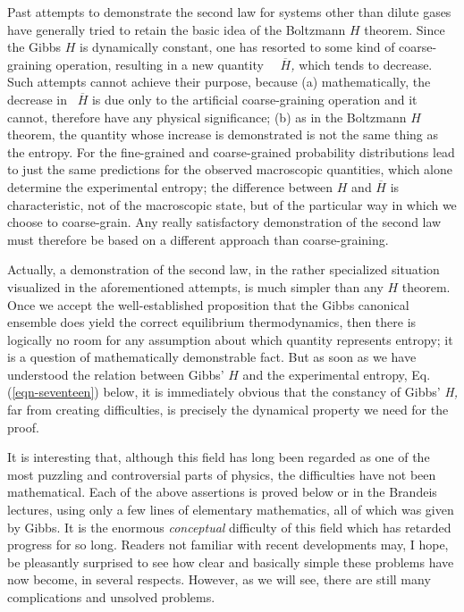 \documentclass[twocolumn]{article}
\begin{document}
Past attempts to demonstrate the second law for systems other than
dilute gases have generally tried to retain the basic idea of the
Boltzmann $H$ theorem. Since the Gibbs $H$ is dynamically
constant, one has resorted to some kind of coarse-graining operation,
resulting in a new quantity ~~\(\overline{H}\)\emph{,} which tends to
decrease. Such attempts cannot achieve their purpose, because (a)
mathematically, the decrease in ~\(\overline{H}\) is due only to the
artificial coarse-graining operation and it cannot, therefore have any
physical significance; (b) as in the Boltzmann $H$ theorem, the
quantity whose increase is demonstrated is not the same thing as the
entropy. For the fine-grained and coarse-grained probability
distributions lead to just the same predictions for the observed
macroscopic quantities, which alone determine the experimental entropy;
the difference between \(H\) and \(\overline{H}\) is characteristic, not
of the macroscopic state, but of the particular way in which we choose
to coarse-grain. Any really satisfactory demonstration of the second law
must therefore be based on a different approach than coarse-graining.

Actually, a demonstration of the second law, in the rather specialized
situation visualized in the aforementioned attempts, is much simpler
than any $H$ theorem. Once we accept the well-established
proposition that the Gibbs canonical ensemble does yield the correct
equilibrium thermodynamics, then there is logically no room for any
assumption about which quantity represents entropy; it is a question of
mathematically demonstrable fact. But as soon as we have understood the
relation between Gibbs' $H$ and the experimental entropy, Eq. (\ref{eqn-seventeen})
below, it is immediately obvious that the constancy of Gibbs' \emph{H,}
far from creating difficulties, is precisely the dynamical property we
need for the proof.

It is interesting that, although this field has long been regarded as
one of the most puzzling and controversial parts of physics, the
difficulties have not been mathematical. Each of the above assertions is
proved below or in the Brandeis lectures, using only a few lines of
elementary mathematics, all of which was given by Gibbs. It is the
enormous \emph{conceptual} difficulty of this field which has retarded
progress for so long. Readers not familiar with recent developments may,
I hope, be pleasantly surprised to see how clear and basically simple
these problems have now become, in several respects. However, as we will
see, there are still many complications and unsolved problems.
\end{document}
